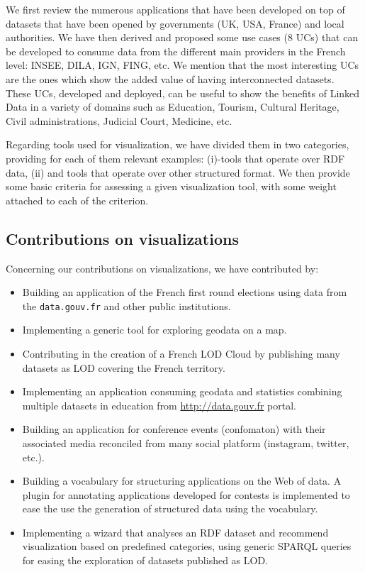 We first review the numerous applications that have been developed on top of datasets that have been opened by governments (UK, USA, France) and local authorities. We have then derived and proposed some use cases (8 UCs) that can be developed to consume data from the different main providers in the French level: INSEE, DILA, IGN, FING, etc. We mention that the most interesting UCs are the ones which show the added value of having interconnected datasets. These UCs,  developed and deployed, can be useful to show the benefits of Linked Data in a variety of domains such as Education, Tourism, Cultural Heritage, Civil administrations, Judicial Court, Medicine, etc. 

Regarding tools used for visualization, we have divided them in two categories, providing for each of them relevant examples: (i)-tools that operate over RDF data, (ii) and tools that operate over other structured format. We then provide some basic criteria for assessing a given visualization tool, with some weight attached to each of the criterion. 


\subsection{Contributions on visualizations}
Concerning our contributions on visualizations, we have contributed by:
\begin{itemize}
\item Building an application of the French first round elections using data from the \texttt{data.gouv.fr} and other public institutions.
\item Implementing a generic tool for exploring geodata on a map.
\item Contributing in the creation of a French LOD Cloud by publishing many datasets as LOD covering the French territory. 
\item Implementing an application consuming geodata and statistics combining multiple datasets in education from \url{http://data.gouv.fr} portal.
\item Building an application for conference events (confomaton) with their associated media reconciled from many social platform (instagram, twitter, etc.).
\item Building a vocabulary for structuring applications on the Web of data. A plugin for annotating applications developed for contests is implemented to ease the use the generation of structured data using the vocabulary. 
\item Implementing a wizard that analyses an RDF dataset and recommend visualization based on predefined categories, using generic SPARQL queries for easing the exploration of datasets published as LOD. 


\end{itemize}

